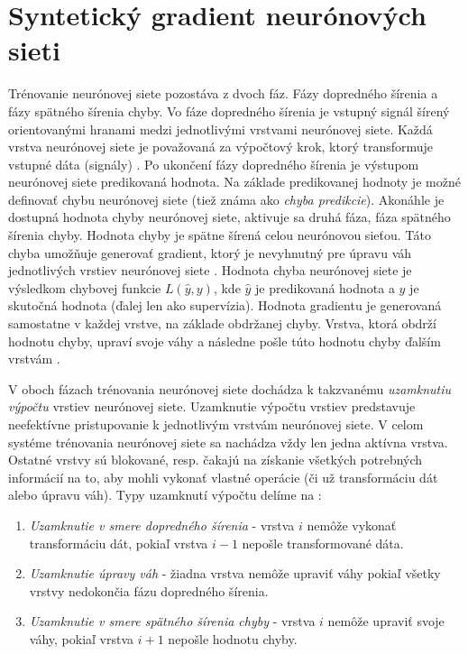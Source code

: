 \chapter{Syntetický gradient neurónových sieti}

\label{synth_grad} %

Trénovanie neurónovej siete pozostáva z dvoch fáz. Fázy dopredného šírenia a fázy spätného šírenia chyby. Vo fáze dopredného šírenia je vstupný signál šírený orientovanými hranami medzi jednotlivými vrstvami neurónovej siete. Každá vrstva neurónovej siete je považovaná za výpočtový krok, ktorý transformuje vstupné dáta (signály) \cite{Jaderberg2016}. Po ukončení fázy dopredného šírenia je výstupom neurónovej siete predikovaná hodnota. Na základe predikovanej hodnoty je možné definovať chybu neurónovej siete (tiež známa ako \textit{chyba predikcie}). Akonáhle je dostupná hodnota chyby neurónovej siete, aktivuje sa druhá fáza, fáza spätného šírenia chyby. Hodnota chyby je spätne šírená celou neurónovou sieťou. Táto chyba umožňuje generovať gradient, ktorý je nevyhnutný pre úpravu váh jednotlivých vrstiev neurónovej siete \cite{Jaderberg2016}. Hodnota chyba neurónovej siete je výsledkom chybovej funkcie $L(\hat{y}, y)$, kde $\hat{y}$ je predikovaná hodnota a $y$ je skutočná hodnota (ďalej len ako supervízia). Hodnota gradientu je generovaná samostatne v každej vrstve, na základe obdržanej chyby. Vrstva, ktorá obdrží hodnotu chyby, upraví svoje váhy a následne pošle túto hodnotu chyby ďalším vrstvám \cite{Goh1995, Czarnecki2017}. 

V oboch fázach trénovania neurónovej siete dochádza k takzvanému \textit{uzamknutiu výpočtu} vrstiev neurónovej siete. Uzamknutie výpočtu vrstiev predstavuje neefektívne pristupovanie k jednotlivým vrstvám neurónovej siete. V celom systéme trénovania neurónovej siete sa nachádza vždy len jedna aktívna vrstva. Ostatné vrstvy sú blokované, resp. čakajú na získanie všetkých potrebných informácií na to, aby mohli vykonať vlastné operácie (či už transformáciu dát alebo úpravu váh). Typy uzamknutí výpočtu delíme na \cite{Jaderberg2016}:
\begin{enumerate}
\item  \textit{Uzamknutie v smere dopredného šírenia} - vrstva $i$ nemôže vykonať transformáciu dát, pokiaľ vrstva $i-1$ nepošle transformované dáta.
\item  \textit{Uzamknutie úpravy váh} - žiadna vrstva nemôže upraviť váhy pokiaľ všetky vrstvy nedokončia fázu dopredného šírenia.
\item  \textit{Uzamknutie v smere spätného šírenia chyby} - vrstva $i$ nemôže upraviť svoje váhy, pokiaľ vrstva $i+1$ nepošle hodnotu chyby.
\end{enumerate}

